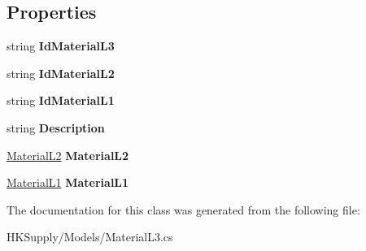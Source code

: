 \subsection*{Properties}
\begin{DoxyCompactItemize}
\item 
\mbox{\label{class_h_k_supply_1_1_models_1_1_material_l3_adde995648c587a27e454989a18f005e9}} 
string {\bfseries Id\+Material\+L3}
\item 
\mbox{\label{class_h_k_supply_1_1_models_1_1_material_l3_a7ee1249a124bcc3478673469b709cbee}} 
string {\bfseries Id\+Material\+L2}
\item 
\mbox{\label{class_h_k_supply_1_1_models_1_1_material_l3_acb5254ae129310c7dc63ccc36ce17e8c}} 
string {\bfseries Id\+Material\+L1}
\item 
\mbox{\label{class_h_k_supply_1_1_models_1_1_material_l3_ab44d75df3f6ed8577217c4553db98d01}} 
string {\bfseries Description}
\item 
\mbox{\label{class_h_k_supply_1_1_models_1_1_material_l3_a68536f524d234993254039d76178c3b4}} 
\mbox{\hyperlink{class_h_k_supply_1_1_models_1_1_material_l2}{Material\+L2}} {\bfseries Material\+L2}
\item 
\mbox{\label{class_h_k_supply_1_1_models_1_1_material_l3_a9c3f0952a885570153be0556a507b96d}} 
\mbox{\hyperlink{class_h_k_supply_1_1_models_1_1_material_l1}{Material\+L1}} {\bfseries Material\+L1}
\end{DoxyCompactItemize}


The documentation for this class was generated from the following file\+:\begin{DoxyCompactItemize}
\item 
H\+K\+Supply/\+Models/Material\+L3.\+cs\end{DoxyCompactItemize}
